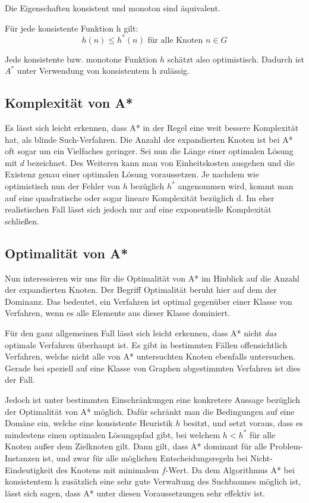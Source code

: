 \begin{theor}
	Die Eigenschaften konsistent und monoton sind äquivalent.
\end{theor}

\begin{theor}
	Für jede konsistente Funktion h gilt: \[h(n)\leq h^{*}(n)\textrm{ für alle Knoten } n \in G\]
\end{theor}
Jede konsistente bzw. monotone Funktion $h$ schätzt also optimistisch. Dadurch ist $A^{*}$ unter Verwendung von konsistentem h zulässig.

\subsection{Komplexität von A*}

Es lässt sich leicht erkennen, dass A* in der Regel eine weit bessere Komplexität hat, als blinde Such-Verfahren. Die Anzahl der expandierten Knoten ist bei A* oft sogar um ein Vielfaches geringer. Sei nun die Länge einer optimalen Lösung mit $d$ bezeichnet. Des Weiteren kann man von Einheitskosten ausgehen und die Existenz genau einer optimalen Lösung voraussetzen.
Je nachdem wie optimistisch nun der Fehler von $h$ bezüglich $h^{*}$ angenommen wird, kommt man auf eine quadratische oder sogar lineare Komplexität bezüglich d. Im eher realistischen Fall lässt sich jedoch nur auf eine exponentielle Komplexität schließen.
\subsection{Optimalität von A*}

Nun interessieren wir uns für die Optimalität von A* im Hinblick auf die Anzahl der expandierten Knoten.
Der Begriff Optimalität beruht hier auf dem der Dominanz. Das bedeutet, ein Verfahren ist optimal gegenüber einer Klasse von Verfahren, wenn es alle Elemente aus dieser Klasse dominiert.

Für den ganz allgemeinen Fall lässt sich leicht erkennen, dass A* nicht \textit{das} optimale Verfahren überhaupt ist. Es gibt in bestimmten Fällen offensichtlich Verfahren, welche nicht alle von A* untersuchten Knoten ebenfalls untersuchen. Gerade bei speziell auf eine Klasse von Graphen abgestimmten Verfahren ist dies der Fall.

Jedoch ist unter bestimmten Einschränkungen eine konkretere Aussage bezüglich der Optimalität von A* möglich. Dafür schränkt man die Bedingungen auf eine Domäne ein, welche eine konsistente Heuristik $h$ besitzt, und setzt voraus, dass es mindestens einen optimalen Lösungspfad gibt, bei welchem $h < h^{*}$ für alle Knoten außer dem Zielknoten gilt. Dann gilt, dass A* dominant für alle Problem-Instanzen ist, und zwar für alle möglichen Entscheidungsregeln bei Nicht-Eindeutigkeit des Knotens mit minimalem $f$-Wert. Da dem Algorithmus A* bei konsistentem h zusätzlich eine sehr gute Verwaltung des Suchbaumes möglich ist, lässt sich sagen, dass A* unter diesen Voraussetzungen sehr effektiv ist.
